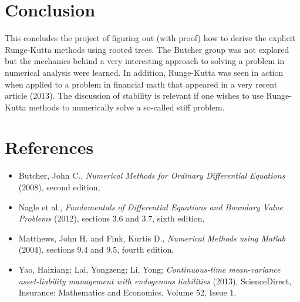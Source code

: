 \documentclass[12pt]{amsart}
\theoremstyle{definition}
\begin{document}
\section{Conclusion}
This concludes the project of figuring out (with proof) how to derive the explicit Runge-Kutta methods using rooted trees.
The Butcher group was not explored but the mechanics behind a very interesting approach to solving a problem
in numerical analysis were learned. In addition, Runge-Kutta was seen in action when applied to a problem in financial
math that appeared in a very recent article (2013). The discussion of stability is relevant  if one wishes to use Runge-Kutta
methods to numerically solve a so-called stiff problem. 

\section[*]{References}
  \begin{itemize} \item Butcher, John C., \textit{Numerical Methods for Ordinary Differential   
  Equations} (2008), second edition,
  \item Nagle et al., \textit{Fundamentals of Differential Equations and Boundary Value Problems}
           (2012), sections 3.6 and 3.7, sixth edition,
  \item Matthews, John H. and Fink, Kurtis D., \textit{Numerical Methods using Matlab} (2004),
           sections 9.4 and 9.5, fourth edition, 
  \item Yao, Haixiang; Lai, Yongzeng; Li, Yong; \textit{Continuous-time mean-variance asset-liability management
  with endogenous liabilities} (2013), ScienceDirect, Insurance: Mathematics and Economics, Volume 52, Issue 1.
  \end{itemize}
\end{document}
